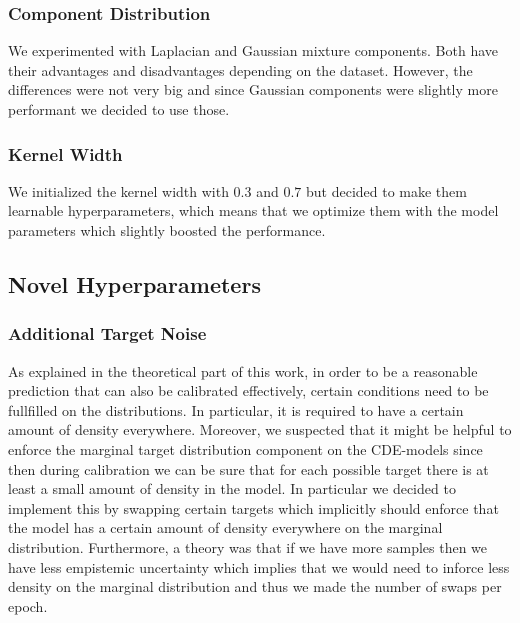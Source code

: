 \subsubsection{Component Distribution}
We experimented with Laplacian and Gaussian mixture components. Both have their advantages and disadvantages depending on the dataset. However, the differences were not very big and since Gaussian components were slightly more performant we decided to use those.

\subsubsection{Kernel Width}
We initialized the kernel width with $0.3$ and $0.7$ but decided to make them learnable hyperparameters, which means that we optimize them with the model parameters which slightly boosted the performance.

\subsection{Novel Hyperparameters}

\subsubsection{Additional Target Noise}

As explained in the theoretical part of this work, in order to be a reasonable prediction that can also be calibrated effectively, certain conditions need to be fullfilled on the distributions. In particular, it is required to have a certain amount of density everywhere. Moreover, we suspected that it might be helpful to enforce the marginal target distribution component on the CDE-models since then during calibration we can be sure that for each possible target there is at least a small amount of density in the model. In particular we decided to implement this by swapping certain targets which implicitly should enforce that the model has a certain amount of density everywhere on the marginal distribution. Furthermore, a theory was that if we have more samples then we have less empistemic uncertainty which implies that we would need to inforce less density on the marginal distribution and thus we made the number of swaps per epoch.

